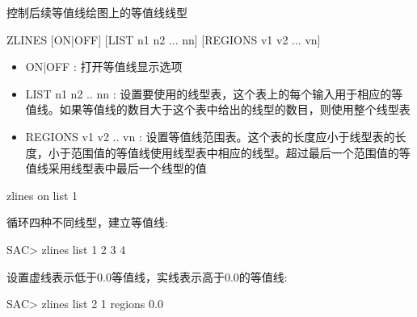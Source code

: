 \label{cmd:zlines}

控制后续等值线绘图上的等值线线型

\begin{SACSTX}
ZLINES  [ON|OFF] [LIST n1 n2 ... nn] [REGIONS v1 v2 ... vn]
\end{SACSTX}

\begin{itemize}
\item ON|OFF : 打开等值线显示选项 
\item LIST n1 n2 .. nn : 设置要使用的线型表，这个表上的每个输入用于相应的等值线。如果等值线的数目大于这个表中给出的线型的数目，则使用整个线型表 
\item REGIONS v1 v2 .. vn : 设置等值线范围表。这个表的长度应小于线型表的长度，小于范围值的等值线使用线型表中相应的线型。超过最后一个范围值的等值线采用线型表中最后一个线型的值
\end{itemize}

\begin{SACDFT}
zlines on list 1
\end{SACDFT}

循环四种不同线型，建立等值线:
\begin{SACCode}
SAC> zlines list 1 2 3 4
\end{SACCode}

设置虚线表示低于0.0等值线，实线表示高于0.0的等值线:
\begin{SACCode}
SAC> zlines list 2 1 regions 0.0
\end{SACCode}


